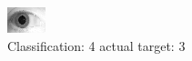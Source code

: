 \begin{figure}[h!]
\begin{center}
\includegraphics[width=0.60\columnwidth]{figures/ID1902_class_4_target_3.png}
\end{center}
\caption{ Classification: 4 actual target: 3}
\label{fig:ID1902_class_4_target_3}
\end{figure}
